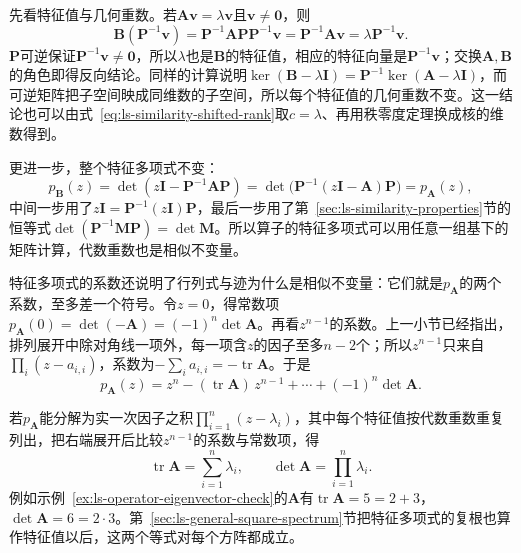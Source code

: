 先看特征值与几何重数。若$\bm A\bm v=\lambda\bm v$且$\bm v\neq\bm0$，则
\[
 \bm B(\bm P^{-1}\bm v)=\bm P^{-1}\bm A\bm P\bm P^{-1}\bm v=\bm P^{-1}\bm A\bm v=\lambda\bm P^{-1}\bm v .
\]
$\bm P$可逆保证$\bm P^{-1}\bm v\neq\bm0$，所以$\lambda$也是$\bm B$的特征值，相应的特征向量是$\bm P^{-1}\bm v$；交换$\bm A,\bm B$的角色即得反向结论。同样的计算说明$\ker(\bm B-\lambda\bm I)=\bm P^{-1}\ker(\bm A-\lambda\bm I)$，而可逆矩阵把子空间映成同维数的子空间，所以每个特征值的几何重数不变。这一结论也可以由式~\eqref{eq:ls-similarity-shifted-rank}取$c=\lambda$、再用秩零度定理换成核的维数得到。

更进一步，整个特征多项式不变：
\[
 p_{\bm B}(z)=\det(z\bm I-\bm P^{-1}\bm A\bm P)=\det\bigl(\bm P^{-1}(z\bm I-\bm A)\bm P\bigr)=p_{\bm A}(z),
\]
中间一步用了$z\bm I=\bm P^{-1}(z\bm I)\bm P$，最后一步用了第~\ref{sec:ls-similarity-properties}节的恒等式$\det(\bm P^{-1}\bm M\bm P)=\det\bm M$。所以算子的特征多项式可以用任意一组基下的矩阵计算，代数重数也是相似不变量。

特征多项式的系数还说明了行列式与迹为什么是相似不变量：它们就是$p_{\bm A}$的两个系数，至多差一个符号。令$z=0$，得常数项$p_{\bm A}(0)=\det(-\bm A)=(-1)^n\det\bm A$。再看$z^{n-1}$的系数。上一小节已经指出，排列展开中除对角线一项外，每一项含$z$的因子至多$n-2$个；所以$z^{n-1}$只来自$\prod_i(z-a_{i,i})$，系数为$-\sum_ia_{i,i}=-\operatorname{tr}\bm A$。于是
\[
 p_{\bm A}(z)=z^n-(\operatorname{tr}\bm A)\,z^{n-1}+\cdots+(-1)^n\det\bm A .
\]

若$p_{\bm A}$能分解为实一次因子之积$\prod_{i=1}^n(z-\lambda_i)$，其中每个特征值按代数重数重复列出，把右端展开后比较$z^{n-1}$的系数与常数项，得
\[
 \operatorname{tr}\bm A=\sum_{i=1}^n\lambda_i,\qquad \det\bm A=\prod_{i=1}^n\lambda_i .
\]
例如示例~\ref{ex:ls-operator-eigenvector-check}的$\bm A$有$\operatorname{tr}\bm A=5=2+3$，$\det\bm A=6=2\cdot3$。第~\ref{sec:ls-general-square-spectrum}节把特征多项式的复根也算作特征值以后，这两个等式对每个方阵都成立。

